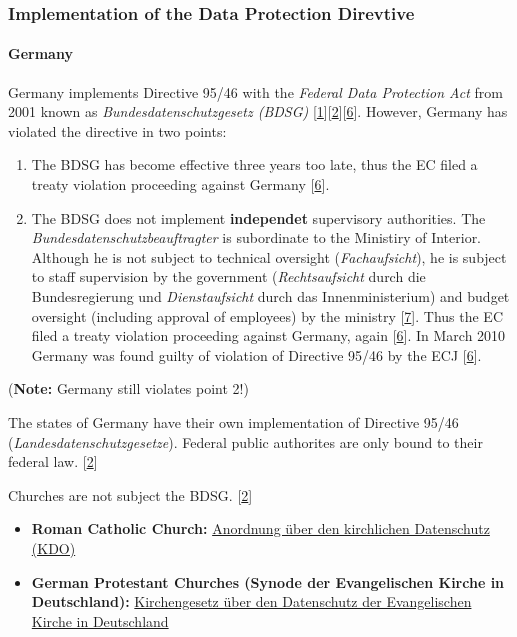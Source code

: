 \subsubsection{Implementation of the Data Protection Direvtive}

\paragraph{Germany}

Germany implements Directive 95/46 with the \emph{Federal Data
Protection Act} from 2001 known as \emph{Bundesdatenschutzgesetz (BDSG)}
{[}\hyperref[references]{1}{]}{[}\hyperref[references]{2}{]}{[}\hyperref[references]{6}{]}.
However, Germany has violated the directive in two points:

\begin{enumerate}
\itemsep1pt\parskip0pt
\item
  The BDSG has become effective three years too late, thus the EC filed
  a treaty violation proceeding against Germany
  {[}\hyperref[references]{6}{]}.
\item
  The BDSG does not implement \textbf{independet} supervisory
  authorities. The \emph{Bundesdatenschutzbeauftragter} is subordinate
  to the Ministiry of Interior. Although he is not subject to technical
  oversight (\emph{Fachaufsicht}), he is subject to staff supervision by
  the government (\emph{Rechtsaufsicht} durch die Bundesregierung und
  \emph{Dienstaufsicht} durch das Innenministerium) and budget oversight
  (including approval of employees) by the ministry
  {[}\hyperref[references]{7}{]}. Thus the EC filed a treaty violation
  proceeding against Germany, again {[}\hyperref[references]{6}{]}. In
  March 2010 Germany was found guilty of violation of Directive 95/46 by
  the ECJ {[}\hyperref[references]{6}{]}.
\end{enumerate}

(\textbf{Note:} Germany still violates point 2!)

The states of Germany have their own implementation of Directive 95/46
(\emph{Landesdatenschutzgesetze}). Federal public authorites are only
bound to their federal law. {[}\hyperref[references]{2}{]}

Churches are not subject the BDSG. {[}\hyperref[references]{2}{]}

\begin{itemize}
\itemsep1pt\parskip0pt
\item
  \textbf{Roman Catholic Church:}
  \href{http://de.wikipedia.org/wiki/Anordnung_\%C3\%BCber_den_kirchlichen_Datenschutz}{Anordnung
  über den kirchlichen Datenschutz (KDO)}
\item
  \textbf{German Protestant Churches (Synode der Evangelischen Kirche in
  Deutschland):}
  \href{http://de.wikipedia.org/wiki/Datenschutzgesetz_der_Evangelischen_Kirche_in_Deutschland}{Kirchengesetz
  über den Datenschutz der Evangelischen Kirche in Deutschland}
\end{itemize}

